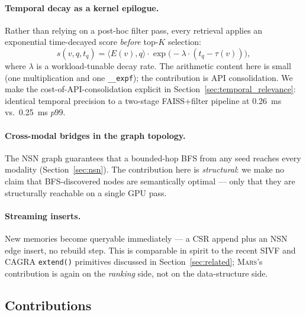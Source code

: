 \documentclass[11pt]{article}
\newcommand{\mars}{\textsc{Mars}}
\begin{document}
\paragraph{Temporal decay as a kernel epilogue.} Rather than relying
on a post-hoc filter pass, every retrieval applies an exponential
time-decayed score \emph{before} top-$K$ selection:
\[
s(v, q, t_q) = \langle E(v), q \rangle \cdot
  \exp\!\bigl(-\lambda \cdot (t_q - \tau(v))\bigr),
\]
where $\lambda$ is a workload-tunable decay rate. The arithmetic
content here is small (one multiplication and one
\texttt{\_\_expf}); the contribution is API consolidation. We make
the cost-of-API-consolidation explicit in
Section~\ref{sec:temporal_relevance}: identical temporal precision to
a two-stage FAISS+filter pipeline at 0.26~ms vs.\ 0.25~ms $p99$.

\paragraph{Cross-modal bridges in the graph topology.} The NSN graph
guarantees that a bounded-hop BFS from any seed reaches every
modality (Section~\ref{sec:nsn}). The contribution here is
\emph{structural}: we make no claim that BFS-discovered nodes are
semantically optimal --- only that they are structurally reachable
on a single GPU pass.

\paragraph{Streaming inserts.} New memories become queryable
immediately --- a CSR append plus an NSN edge insert, no rebuild
step. This is comparable in spirit to the recent SIVF and CAGRA
\texttt{extend()} primitives discussed in Section~\ref{sec:related};
\mars{}'s contribution is again on the \emph{ranking} side, not on
the data-structure side.

\subsection{Contributions}
\end{document}
